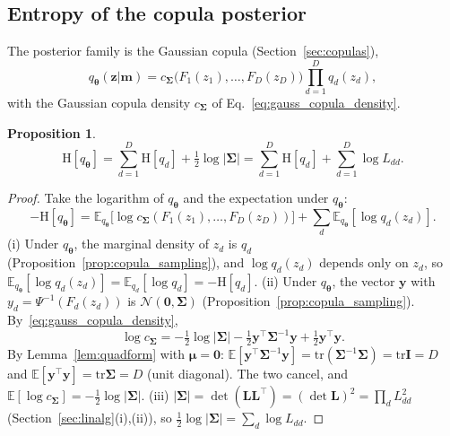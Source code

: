 \documentclass[11pt,a4paper]{article}
\numberwithin{equation}{section}
\theoremstyle{plain}
\newtheorem{proposition}{Proposition}[section]
\theoremstyle{definition}
\theoremstyle{remark}
\newcommand{\m}{\mathbf{m}}
\newcommand{\z}{\mathbf{z}}
\newcommand{\y}{\mathbf{y}}
\newcommand{\mub}{\bm{\mu}}
\newcommand{\Sig}{\bm{\Sigma}}
\newcommand{\Lb}{\mathbf{L}}
\newcommand{\I}{\mathbf{I}}
\newcommand{\E}{\mathbb{E}}
\newcommand{\tr}{\mathrm{tr}}
\newcommand{\Hent}{\mathrm{H}}
\newcommand{\N}{\mathcal{N}}
\newcommand{\qth}{q_{\bm{\theta}}}
\begin{document}
\subsection{Entropy of the copula posterior}
\label{sec:copula_entropy}
The posterior family is the Gaussian copula (Section~\ref{sec:copulas}),
\begin{equation}
\qth(\z|\m)=c_{\Sig}\big(F_1(z_1),\dots,F_D(z_D)\big)\prod_{d=1}^Dq_d(z_d),
\end{equation}
with the Gaussian copula density $c_{\Sig}$ of Eq.~\eqref{eq:gauss_copula_density}.
\begin{proposition}
\label{prop:copula_entropy}
\begin{equation}
\Hent[\qth]=\sum_{d=1}^D\Hent[q_d]+\tfrac12\log|\Sig|=\sum_{d=1}^D\Hent[q_d]+\sum_{d=1}^D\log L_{dd}.
\label{eq:copula_entropy}
\end{equation}
\end{proposition}
\begin{proof}
Take the logarithm of $\qth$ and the expectation under $\qth$:
\begin{equation*}
-\Hent[\qth]=\E_{\qth}\big[\log c_{\Sig}(F_1(z_1),\dots,F_D(z_D))\big]+\sum_d\E_{\qth}[\log q_d(z_d)].
\end{equation*}
(i) Under $\qth$, the marginal density of $z_d$ is $q_d$ (Proposition~\ref{prop:copula_sampling}), and $\log q_d(z_d)$ depends only on $z_d$, so $\E_{\qth}[\log q_d(z_d)]=\E_{q_d}[\log q_d]=-\Hent[q_d]$.
(ii) Under $\qth$, the vector $\y$ with $y_d=\Psi^{-1}(F_d(z_d))$ is $\N(\mathbf0,\Sig)$ (Proposition~\ref{prop:copula_sampling}). By~\eqref{eq:gauss_copula_density},
\begin{equation*}
\log c_{\Sig}=-\tfrac12\log|\Sig|-\tfrac12\y^\top\Sig^{-1}\y+\tfrac12\y^\top\y.
\end{equation*} By Lemma~\ref{lem:quadform} with $\mub=\mathbf0$: $\E[\y^\top\Sig^{-1}\y]=\tr(\Sig^{-1}\Sig)=\tr\I=D$ and $\E[\y^\top\y]=\tr\Sig=D$ (unit diagonal). The two cancel, and $\E[\log c_{\Sig}]=-\tfrac12\log|\Sig|$.
(iii) $|\Sig|=\det(\Lb\Lb^\top)=(\det\Lb)^2=\prod_dL_{dd}^2$ (Section~\ref{sec:linalg}(i),(ii)), so $\tfrac12\log|\Sig|=\sum_d\log L_{dd}$.
\end{proof}
\end{document}
